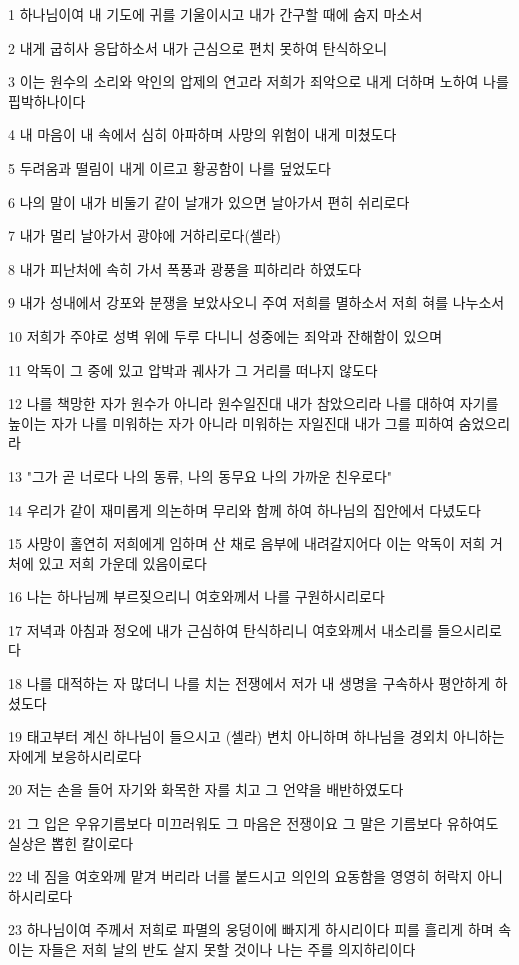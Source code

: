 \par 1 하나님이여 내 기도에 귀를 기울이시고 내가 간구할 때에 숨지 마소서
\par 2 내게 굽히사 응답하소서 내가 근심으로 편치 못하여 탄식하오니
\par 3 이는 원수의 소리와 악인의 압제의 연고라 저희가 죄악으로 내게 더하며 노하여 나를 핍박하나이다
\par 4 내 마음이 내 속에서 심히 아파하며 사망의 위험이 내게 미쳤도다
\par 5 두려움과 떨림이 내게 이르고 황공함이 나를 덮었도다
\par 6 나의 말이 내가 비둘기 같이 날개가 있으면 날아가서 편히 쉬리로다
\par 7 내가 멀리 날아가서 광야에 거하리로다(셀라)
\par 8 내가 피난처에 속히 가서 폭풍과 광풍을 피하리라 하였도다
\par 9 내가 성내에서 강포와 분쟁을 보았사오니 주여 저희를 멸하소서 저희 혀를 나누소서
\par 10 저희가 주야로 성벽 위에 두루 다니니 성중에는 죄악과 잔해함이 있으며
\par 11 악독이 그 중에 있고 압박과 궤사가 그 거리를 떠나지 않도다
\par 12 나를 책망한 자가 원수가 아니라 원수일진대 내가 참았으리라 나를 대하여 자기를 높이는 자가 나를 미워하는 자가 아니라 미워하는 자일진대 내가 그를 피하여 숨었으리라
\par 13 "그가 곧 너로다 나의 동류, 나의 동무요 나의 가까운 친우로다"
\par 14 우리가 같이 재미롭게 의논하며 무리와 함께 하여 하나님의 집안에서 다녔도다
\par 15 사망이 홀연히 저희에게 임하며 산 채로 음부에 내려갈지어다 이는 악독이 저희 거처에 있고 저희 가운데 있음이로다
\par 16 나는 하나님께 부르짖으리니 여호와께서 나를 구원하시리로다
\par 17 저녁과 아침과 정오에 내가 근심하여 탄식하리니 여호와께서 내소리를 들으시리로다
\par 18 나를 대적하는 자 많더니 나를 치는 전쟁에서 저가 내 생명을 구속하사 평안하게 하셨도다
\par 19 태고부터 계신 하나님이 들으시고 (셀라) 변치 아니하며 하나님을 경외치 아니하는 자에게 보응하시리로다
\par 20 저는 손을 들어 자기와 화목한 자를 치고 그 언약을 배반하였도다
\par 21 그 입은 우유기름보다 미끄러워도 그 마음은 전쟁이요 그 말은 기름보다 유하여도 실상은 뽑힌 칼이로다
\par 22 네 짐을 여호와께 맡겨 버리라 너를 붙드시고 의인의 요동함을 영영히 허락지 아니하시리로다
\par 23 하나님이여 주께서 저희로 파멸의 웅덩이에 빠지게 하시리이다 피를 흘리게 하며 속이는 자들은 저희 날의 반도 살지 못할 것이나 나는 주를 의지하리이다


